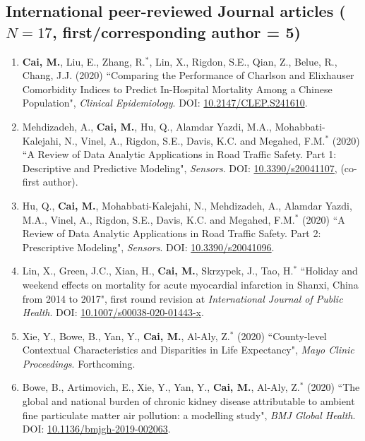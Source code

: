 \documentclass[11pt, a4paper]{article}
\newcommand{\years}[1]{\marginnote{\scriptsize #1}}
\begin{document}
	\subsection*{International peer-reviewed Journal articles ($N=17$, first/corresponding author = 5)}
	\begin{enumerate}[leftmargin=0ex,itemsep=1ex]
		\item \years{2020}\textbf{Cai, M.}, Liu, E., Zhang, R.$^\ast$, Lin, X., Rigdon, S.E., Qian, Z., Belue, R., Chang, J.J. (2020) ``Comparing the Performance of Charlson and Elixhauser Comorbidity Indices to Predict In-Hospital Mortality Among a Chinese Population", \emph{Clinical Epidemiology}. DOI: \href{https://doi.org/10.2147/CLEP.S241610}{10.2147/CLEP.S241610}.
		
		\item Mehdizadeh, A., \textbf{Cai, M.}, Hu, Q., Alamdar Yazdi, M.A., Mohabbati-Kalejahi, N., Vinel, A., Rigdon, S.E., Davis, K.C. and Megahed, F.M.$^\ast$ (2020) ``A Review of Data Analytic Applications in Road Traffic Safety. Part 1: Descriptive and Predictive Modeling", \emph{Sensors}. DOI: \href{https://doi.org/10.3390/s20041107}{10.3390/s20041107}, (co-first author).
		
		\item Hu, Q., \textbf{Cai, M.}, Mohabbati-Kalejahi, N., Mehdizadeh, A., Alamdar Yazdi, M.A., Vinel, A., Rigdon, S.E., Davis, K.C. and Megahed, F.M.$^\ast$ (2020) ``A Review of Data Analytic Applications in Road Traffic Safety. Part 2: Prescriptive Modeling", \emph{Sensors}. DOI: \href{https://doi.org/10.3390/s20041096}{10.3390/s20041096}.
		
		\item Lin, X., Green, J.C., Xian, H., \textbf{Cai, M.}, Skrzypek, J., Tao, H.$^\ast$ ``Holiday and weekend effects on mortality for acute myocardial infarction in Shanxi, China from 2014 to 2017", first round revision at \emph{International Journal of Public Health}. DOI: \href{https://doi.org/10.1007/s00038-020-01443-x}{10.1007/s00038-020-01443-x}.
		
		\item Xie, Y., Bowe, B., Yan, Y., \textbf{Cai, M.}, Al-Aly, Z.$^\ast$ (2020) ``County-level Contextual Characteristics and Disparities in Life Expectancy", \emph{Mayo Clinic Proceedings}. Forthcoming.
		
		\item Bowe, B., Artimovich, E., Xie, Y., Yan, Y., \textbf{Cai, M.}, Al-Aly, Z.$^\ast$ (2020) ``The global and national burden of chronic kidney disease attributable to ambient fine particulate matter air pollution: a modelling study", \emph{BMJ Global Health}. DOI: \href{https://doi.org/10.1136/bmjgh-2019-002063}{10.1136/bmjgh-2019-002063}.
		

\end{enumerate}
\end{document}
